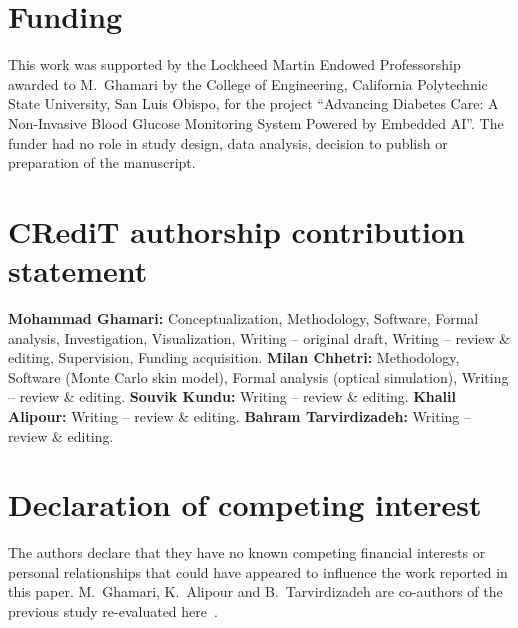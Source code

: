 \documentclass[11pt]{article}
\begin{document}
\section*{Funding}
This work was supported by the Lockheed Martin Endowed Professorship awarded to M.~Ghamari by the College of Engineering, California Polytechnic State University, San Luis Obispo, for the project ``Advancing Diabetes Care: A Non-Invasive Blood Glucose Monitoring System Powered by Embedded AI''. The funder had no role in study design, data analysis, decision to publish or preparation of the manuscript.

\section*{CRediT authorship contribution statement}
\textbf{Mohammad Ghamari:} Conceptualization, Methodology, Software, Formal analysis, Investigation, Visualization, Writing -- original draft, Writing -- review \& editing, Supervision, Funding acquisition. \textbf{Milan Chhetri:} Methodology, Software (Monte Carlo skin model), Formal analysis (optical simulation), Writing -- review \& editing. \textbf{Souvik Kundu:} Writing -- review \& editing. \textbf{Khalil Alipour:} Writing -- review \& editing. \textbf{Bahram Tarvirdizadeh:} Writing -- review \& editing.

\section*{Declaration of competing interest}
The authors declare that they have no known competing financial interests or personal relationships that could have appeared to influence the work reported in this paper. M.~Ghamari, K.~Alipour and B.~Tarvirdizadeh are co-authors of the previous study re-evaluated here~\citep{zeynali2025}.
\end{document}

